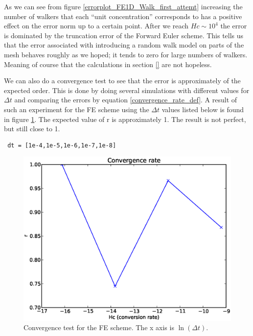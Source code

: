 As we can see from figure \ref{errorplot_FE1D_Walk_first_attemt} increasing the number of walkers that each ``unit concentration'' corresponds to has a positive effect on the error norm up to a certain point. 
After we reach $Hc \sim 10^4$ the error is dominated by the truncation error of the Forward Euler scheme. 
This tells us that the error associated with introducing a random walk model on parts of the mesh behaves roughly as we hoped; it tends to zero for large numbers of walkers. 
Meaning of course that the calculations in section \ref{} are not hopeless.

We can also do a convergence test to see that the error is approximately of the expected order. 
This is done by doing several simulations with different values for $\Delta t$ and comparing the errors by equation \ref{convergence_rate_def}. 
A result of such an experiment for the FE scheme using the $\Delta t$ values listed below is found in figure \ref{convergence_test_FE}. 
The expected value of r is approximately 1. The result is not perfect, but still close to 1.
\begin{lstlisting}
 dt = [1e-4,1e-5,1e-6,1e-7,1e-8]
\end{lstlisting}
\begin{figure}[H]
 \centering
 \includegraphics[scale=0.7]{../doc/results/experiment_27112013_1017/results/ConvergenceTest.eps}
 \caption{Convergence test for the FE scheme. The x axis is $\ln(\Delta t)$.}
 \label{convergence_test_FE}
\end{figure}



